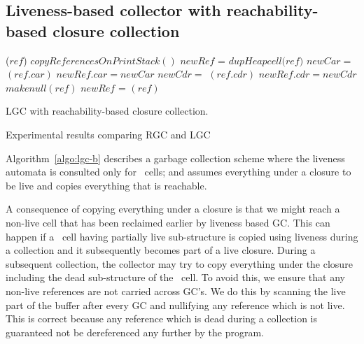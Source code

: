\documentclass[9pt]{sigplanconf}
\begin{document}
\subsection{Liveness-based collector with reachability-based closure
  collection}
\begin{algorithm}[t]
  \Fn{\Lgc{}}
     {
            {\LCopy($\mathit{ref}$)\;}
            $\mathit{copyReferencesOnPrintStack()}$\;  
     }
        {
              {
                     {
                       $\mathit{newRef}$ =  $\mathit{dupHeapcell(ref})$\; 
                       $\mathit{ newCar}  =$  \LCopy$\mathit{(ref.car)}$\;
                       $\mathit{ newRef.car}   = \mathit{ newCar}$\;
                       $\mathit{ newCdr}  =$  \LCopy$\mathit{(ref.cdr)}$\;
                       $\mathit{ newRef.cdr}   = \mathit{newCdr}$\;
                     }
                     { $\mathit{makenull(ref)}$\;}}
              {
                    { 
                      $\mathit{newRef}$  = \RCopy$(\mathit{ref})$\;
                    }
              }
        }
        \caption{LGC with reachability-based closure collection.\label{algo:lgc-b}}
\end{algorithm}
\begin{table*}[ht!]
\caption{Experimental results comparing RGC and LGC}
\label{tab:experimental-results}
\centering

\end{table*}

  Algorithm~\ref{algo:lgc-b}  describes  a garbage  collection  scheme
  where the liveness automata is  consulted only for \CONS\ cells; and
  assumes everything under a closure  to be live and copies everything
  that is reachable.
 
A consequence of  copying everything under a closure is  that we might
reach  a non-live  cell that  has been  reclaimed earlier  by liveness
based GC.   This can  happen if  a \CONS\  cell having  partially live
sub-structure  is copied  using liveness  during a  collection and  it
subsequently  becomes part  of a  live closure.   During a  subsequent
collection, the collector may try to copy everything under the closure
including the dead  sub-structure of the \CONS\ cell.   To avoid this,
we ensure  that any non-live  references are not carried  across GC's.
We do this by scanning the live  part of the buffer after every GC and
nullifying any  reference which is  not live. This is  correct because
any reference which  is dead during a collection is  guaranteed not be
dereferenced any further by the program.
\end{document}
